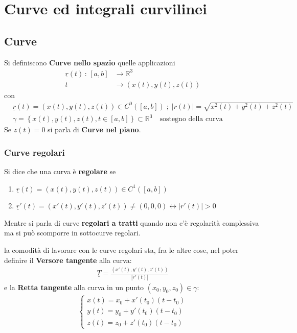 \chapter{Curve ed integrali curvilinei}

\section{Curve}

Si definiscono \textbf{Curve nello spazio} quelle applicazioni
\begin{align}
	\underline{r}(t) \, : \, [a,b] {}&\longrightarrow \mathbb{R}^3 \\
	t &\longrightarrow (x(t),y(t),z(t))
\end{align}
con 
\begin{align}
&\underline{r}(t)=(x(t),y(t),z(t)) \in C^0([a,b]) \; ; \; |r(t)|=\sqrt{x^2(t) + y^2(t) + z^2(t)} \\
&\gamma = \left\{ x(t),y(t),z(t), t\in [a,b]
\right\} \subset \mathbb{R}^3 \quad \text{sostegno della curva}
\end{align}
Se $z(t)=0$ si parla di \textbf{Curve nel piano}.

\subsection{Curve regolari}

Si dice che una curva è \textbf{regolare} se
\begin{enumerate}
	\item $\underline{r}(t)=(x(t),y(t),z(t)) \in C^1([a,b])$
	\item $\underline{r}'(t)= (x'(t),y'(t),z'(t)) \neq (0,0,0) \leftrightarrow |r'(t)|>0$
\end{enumerate}

Mentre si parla di curve \textbf{regolari a tratti} quando non c'è regolarità complessiva ma si può scomporre in sottocurve regolari.

la comodità di lavorare con le curve regolari sta, fra le altre cose, nel poter definire il \textbf{Versore tangente} alla curva:
\begin{align}
\underline{T}= \frac{(x'(t),y'(t),z'(t))}{|r'(t)|}
\end{align}
e la \textbf{Retta tangente} alla curva in un punto $(x_0,y_0,z_0)\in \gamma$:
\begin{align}
\left\{
\begin{array}{ccc}
x(t)= x_0 + x'(t_0)(t-t_0) \\
y(t)= y_0 + y'(t_0)(t-t_0) \\
z(t)= z_0 + z'(t_0)(t-t_0)
\end{array}
\right.
\end{align}

